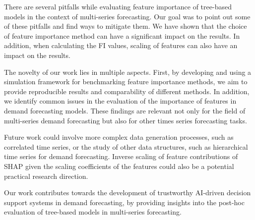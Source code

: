 There are several pitfalls while evaluating feature importance of tree-based models in the context of multi-series forecasting.
Our goal was to point out some of these pitfalls and find ways to mitigate them.
We have shown that the choice of feature importance method can have a significant impact on the results.
In addition, when calculating the FI values, scaling of features can also have an impact on the results.

The novelty of our work lies in multiple aspects.
First, by developing and using a simulation framework for benchmarking feature importance methods, we aim to provide reproducible results and comparability of different methods.
In addition, we identify common issues in the evaluation of the importance of features in demand forecasting models.
These findings are relevant not only for the field of multi-series demand forecasting but also for other times series forecasting tasks.

Future work could involve more complex data generation processes, such as correlated time series, or the study of other data structures, such as hierarchical time series for demand forecasting.
Inverse scaling of feature contributions of SHAP given the scaling coefficients of the features could also be a potential practical research direction.

Our work contributes towards the development of trustworthy AI-driven decision support systems in demand forecasting, by providing insights into the post-hoc evaluation of tree-based models in multi-series forecasting.
